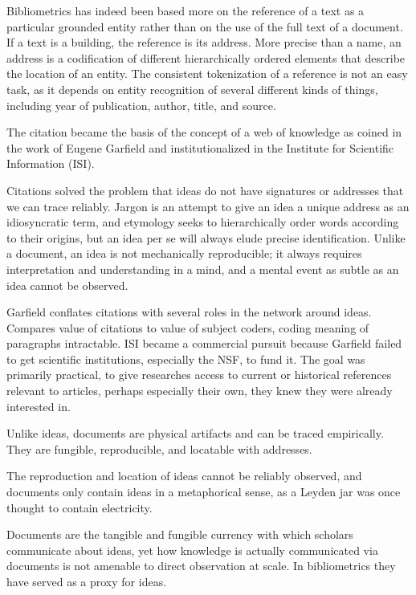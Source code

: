 \documentclass[]{book}
\theoremstyle{definition}
\theoremstyle{definition}
\theoremstyle{definition}
\theoremstyle{remark}
\begin{document}
Bibliometrics has indeed been based more on the reference of a text as a
particular grounded entity rather than on the use of the full text of a
document. If a text is a building, the reference is its address. More
precise than a name, an address is a codification of different
hierarchically ordered elements that describe the location of an entity.
The consistent tokenization of a reference is not an easy task, as it
depends on entity recognition of several different kinds of things,
including year of publication, author, title, and source.

The citation became the basis of the concept of a web of knowledge as
coined in the work of Eugene Garfield and institutionalized in the
Institute for Scientific Information (ISI).

Citations solved the problem that ideas do not have signatures or
addresses that we can trace reliably. Jargon is an attempt to give an
idea a unique address as an idiosyncratic term, and etymology seeks to
hierarchically order words according to their origins, but an idea per
se will always elude precise identification. Unlike a document, an idea
is not mechanically reproducible; it always requires interpretation and
understanding in a mind, and a mental event as subtle as an idea cannot
be observed.

\citep{Lederberg2000How} Garfield conflates citations with several roles
in the network around ideas. Compares value of citations to value of
subject coders, coding meaning of paragraphs intractable. ISI became a
commercial pursuit because Garfield failed to get scientific
institutions, especially the NSF, to fund it. The goal was primarily
practical, to give researches access to current or historical references
relevant to articles, perhaps especially their own, they knew they were
already interested in.

Unlike ideas, documents are physical artifacts and can be traced
empirically. They are fungible, reproducible, and locatable with
addresses.

The reproduction and location of ideas cannot be reliably observed, and
documents only contain ideas in a metaphorical sense, as a Leyden jar
was once thought to contain electricity.

Documents are the tangible and fungible currency with which scholars
communicate about ideas, yet how knowledge is actually communicated via
documents is not amenable to direct observation at scale. In
bibliometrics they have served as a proxy for ideas.
\end{document}
